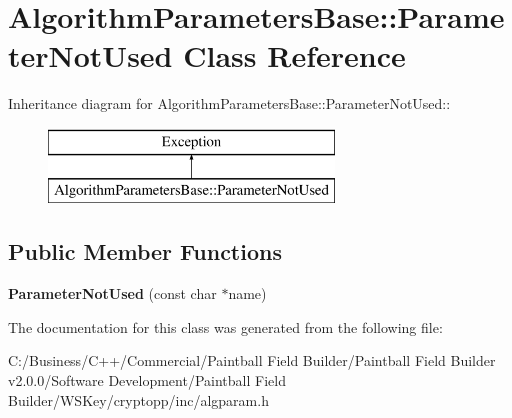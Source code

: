 \hypertarget{class_algorithm_parameters_base_1_1_parameter_not_used}{
\section{AlgorithmParametersBase::ParameterNotUsed Class Reference}
\label{class_algorithm_parameters_base_1_1_parameter_not_used}
}
Inheritance diagram for AlgorithmParametersBase::ParameterNotUsed::\begin{figure}[H]
\begin{center}
\leavevmode
\includegraphics[height=2cm]{class_algorithm_parameters_base_1_1_parameter_not_used}
\end{center}
\end{figure}
\subsection*{Public Member Functions}
\begin{DoxyCompactItemize}
\item 
\hypertarget{class_algorithm_parameters_base_1_1_parameter_not_used_a526f3285344b14ef66c8b5da20f79331}{
{\bfseries ParameterNotUsed} (const char $\ast$name)}
\label{class_algorithm_parameters_base_1_1_parameter_not_used_a526f3285344b14ef66c8b5da20f79331}

\end{DoxyCompactItemize}


The documentation for this class was generated from the following file:\begin{DoxyCompactItemize}
\item 
C:/Business/C++/Commercial/Paintball Field Builder/Paintball Field Builder v2.0.0/Software Development/Paintball Field Builder/WSKey/cryptopp/inc/algparam.h\end{DoxyCompactItemize}
